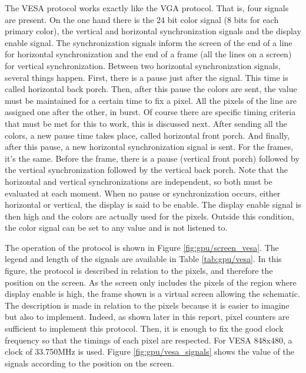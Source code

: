 The VESA protocol works exactly like the VGA protocol. That is, four signals are present. On the 
one hand there is the 24 bit color signal (8 bits for each primary color), the vertical and 
horizontal synchronization signals and the display enable signal. The synchronization signals 
inform the screen of the end of a line for horizontal synchronization and the end of a frame (all 
the lines on a screen) for vertical synchronization. Between two horizontal synchronization 
signals, several things happen. First, there is a pause just after the signal. This time is called 
horizontal back porch. Then, after this pause the colors are sent, the value must be maintained for 
a certain time to fix a pixel. All the pixels of the line are assigned one after the other, in 
burst. Of course there are specific timing criteria that must be met for this to work, this is 
discussed next. After sending all the colors, a new pause time takes place, called horizontal front 
porch. And finally, after this pause, a new horizontal synchronization signal is sent. For the 
frames, it's the same. Before the frame, there is a pause (vertical front porch) followed by the 
vertical synchronization followed by the vertical back porch. Note that the horizontal and vertical 
synchronizations are independent, so both must be evaluated at each moment. When no pause or 
synchronization occurs, either horizontal or vertical, the display is said to be enable. The 
display enable signal is then high and the colors are actually used for the pixels. Outside this 
condition, the color signal can be set to any value and is not listened to. 

The operation of the protocol is shown in Figure \ref{fig:gpu/screen_vesa}. The legend and length
of the signals are available in Table \ref{tab:gpu/vesa}. In this figure, 
the protocol is described in relation to the pixels, and therefore the position on the screen. As 
the screen only includes the pixels of the region where display enable is high, the frame shown is 
a virtual screen allowing the schematic. The description is made in relation to the pixels because 
it is easier to imagine but also to implement. Indeed, as shown later in this report, pixel 
counters are sufficient to implement this protocol. Then, it is enough to fix the good clock 
frequency so that the timings of each pixel are respected. For VESA 848x480, a clock of 33.750MHz
is used. Figure \ref{fig:gpu/vesa_signals} shows the value of the signals according to the position
on the screen.

